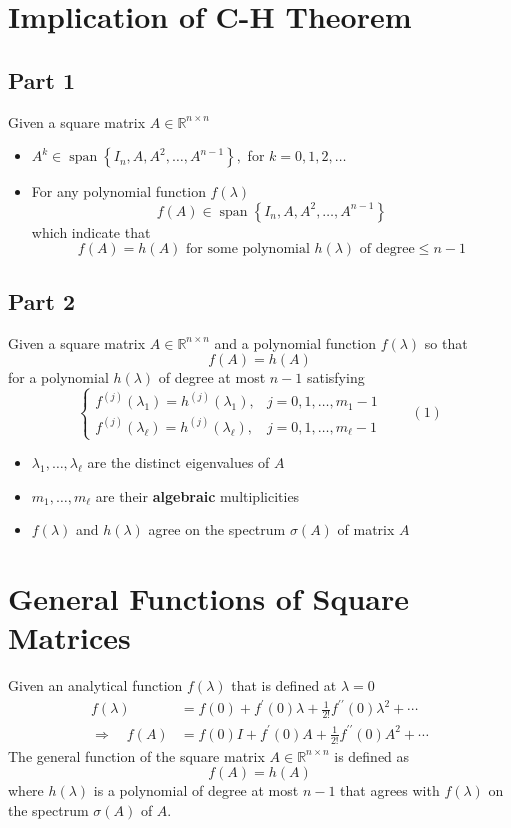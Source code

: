 \documentclass[10pt,a4paper,oneside]{article}
\begin{document}
\section{Implication of C-H Theorem}

\subsection{Part 1}
Given a square matrix $A\in \mathbb{R}^{n\times n}$
\begin{itemize}
\item $A^{k} \in \operatorname{span}\left\{I_{n}, A, A^{2}, \ldots, A^{n-1}\right\},$ for $k=0,1,2, \ldots$
\item For any polynomial function $f(\lambda)$
\[
f(A) \in \operatorname{span}\left\{I_{n}, A, A^{2}, \ldots, A^{n-1}\right\}
\]
which indicate that
\[
f(A)=h(A) \text { for some polynomial } h(\lambda) \text { of } \text {degree} \leq n-1
\]
\end{itemize}

\subsection{Part 2}
Given a square matrix $A\in\mathbb{R}^{n\times n}$ and a polynomial function $f(\lambda)$ so that
\[
f(A)=h(A)
\]
for a polynomial $h(\lambda)$ of degree at most $n-1$ satisfying
\[
\left\{\begin{array}{ll}{f^{(j)}\left(\lambda_{1}\right)=h^{(j)}\left(\lambda_{1}\right),} & {j=0,1, \ldots, m_{1}-1} \\ {f^{(j)}\left(\lambda_{\ell}\right)=h^{(j)}\left(\lambda_{\ell}\right),} & {j=0,1, \ldots, m_{\ell}-1}\end{array}\right.\quad\quad(1)
\]
\begin{itemize}
\item $\lambda_{1}, \ldots, \lambda_{\ell}$ are the distinct eigenvalues of $A$
\item $m_{1}, \ldots, m_{\ell}$ are their \textbf{algebraic} multiplicities
\item $f(\lambda)$ and $h(\lambda)$ agree on the spectrum $\sigma(A)$ of matrix $A$
\end{itemize}

\section{General Functions of Square Matrices}
Given an analytical function $f(\lambda)$ that is defined at $\lambda=0$
\[
\begin{aligned} f(\lambda) &=f(0)+f^{\prime}(0) \lambda+\frac{1}{2 !} f^{\prime \prime}(0) \lambda^{2}+\cdots \\ \Rightarrow \quad f(A) &=f(0) I+f^{\prime}(0) A+\frac{1}{2 !} f^{\prime \prime}(0) A^{2}+\cdots \end{aligned}
\]
The general function of the square matrix $A \in \mathbb{R}^{n \times n}$ is defined as
\[
f(A)=h(A)
\]
where $h(\lambda)$ is a polynomial of degree at most $n-1$ that agrees with $f(\lambda)$
on the spectrum $\sigma(A)$ of $A$.
\end{document}
